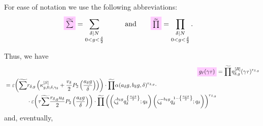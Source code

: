 \documentclass{article}
\begin{document}
For ease of notation we use the following abbreviations:
\begin{alignat}{2}
  \defineNotation[sum-tilde]{\protect\widetilde{\protect\sum}}
  &=
  \sum_{\substack{\divides{\delta}{N}\\0<g<\frac{\delta}{2}}}
  &\qquad\text{and}\qquad
  \defineNotation[prod-tilde]{\protect\widetilde{\protect\prod}}
  &=
  \prod_{\substack{\divides{\delta}{N}\\0<g<\frac{\delta}{2}}}.
\end{alignat}

Thus, we have
\begin{align}
  \defineNotation[g-rtilde-gamma-tau]{g_{\tilde{r}}(\gamma\tau)}
  &=
    \widetilde{\prod}
    \eta_{\delta,g}^{[R]}(\gamma\tau)^{r_{\delta,g}}
  \notag\\
  \begin{split}
  &=
    \unityPower{
      \widetilde{\sum}
      r_{\delta,g}
      \left(
        \kappa_{g,0,\delta,\gamma_\delta}^{[S]}
      +
      \frac{v_\delta}{2} P_2\left(\frac{a_\delta g}{\delta}\right)
      \right)}
  \cdot
  \widetilde{\prod} \alpha(a_\delta g, b_\delta g,\delta)^{r_{\delta,g}}
  \cdot
  \\
  &\qquad\qquad
  \cdot
  \unityPower{\tau
    \widetilde{\sum}
    \frac{r_{\delta,g} u_\delta}{2} P_2\left(\frac{a_\delta g}{\delta}\right)}
  \cdot
  \widetilde{\prod}
  \left(
    \left(
      \zeta_\delta^{b_\delta g} q_\delta^{\left\{\frac{a_\delta g}{\delta}\right\}}
      ;
      q_\delta
  \right)
  \left(
    \zeta_\delta^{-{b_\delta g}} q_\delta^{1-\left\{\frac{a_\delta g}{\delta}\right\}}
    ;
    q_\delta
  \right)
  \right)^{r_{\delta,g}}
  \end{split}
  \label{eq:g_rtilde(gamma*tau)}
\end{align}
%
and, eventually,
%
\end{document}
